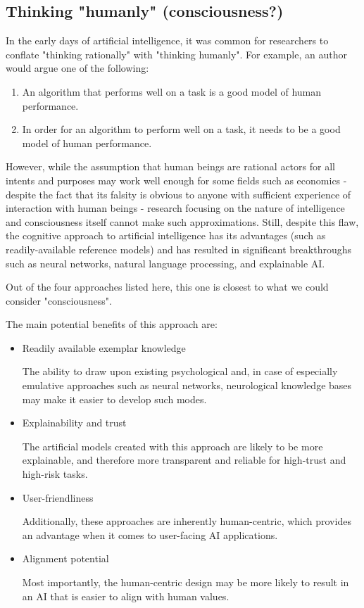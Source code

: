 \documentclass[masterthesis]{fer}
\begin{document}
\subsection{Thinking "humanly" (consciousness?)}
In the early days of artificial intelligence, it was common for researchers to conflate "thinking rationally" with "thinking humanly". For example, an author would argue one of the following:
\begin{enumerate}
\item{An algorithm that performs well on a task is a good model of human performance.}
\item{In order for an algorithm to perform well on a task, it needs to be a good model of human performance.}
\end{enumerate}
However, while the assumption that human beings are rational actors for all intents and purposes may work well enough for some fields such as economics - despite the fact that its falsity is obvious to anyone with sufficient experience of interaction with human beings - research focusing on the nature of intelligence and consciousness itself cannot make such approximations.
Still, despite this flaw, the cognitive approach to artificial intelligence has its advantages (such as readily-available reference models) and has resulted in significant breakthroughs such as neural networks, natural language processing, and explainable AI.

Out of the four approaches listed here, this one is closest to what we could consider "consciousness".

The main potential benefits of this approach are:
\begin{itemize}
\item{Readily available exemplar knowledge}

The ability to draw upon existing psychological and, in case of especially emulative approaches such as neural networks, neurological knowledge bases may make it easier to develop such modes.
\item{Explainability and trust}

The artificial models created with this approach are likely to be more explainable, and therefore more transparent and reliable for high-trust and high-risk tasks.
\item{User-friendliness}

Additionally, these approaches are inherently human-centric, which provides an advantage when it comes to user-facing AI applications.
\item{Alignment potential}

Most importantly, the human-centric design may be more likely to result in an AI that is easier to align with human values.
\end{itemize}
\end{document}

